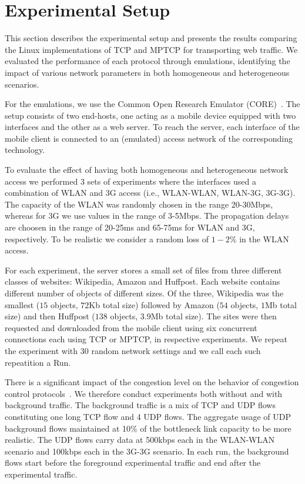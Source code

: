 \section{Experimental Setup }
\label{sec:exp-setup}
This section describes the experimental setup and presents the results comparing
the Linux implementations of TCP and MPTCP for transporting web traffic. We
evaluated the performance of each protocol through emulations, identifying the impact of various network
parameters in both homogeneous and heterogeneous scenarios. 

For the emulations, we use the Common Open Research Emulator (CORE)~\cite{CORE}. The setup consists of
two end-hosts, one acting as a mobile device equipped with two interfaces and the other as a web server. To reach the
server, each interface of the mobile client is connected to an (emulated) access network of the corresponding technology.

To evaluate the effect of having both homogeneous and heterogeneous network access we performed 3 sets
of experiments where the interfaces used a combination of WLAN and 3G access (i.e., WLAN-WLAN, WLAN-3G, 3G-3G).
The capacity of the WLAN was randomly chosen in the range 20-30Mbps, whereas for 3G we use values in the range of 3-5Mbps.
The propagation delays are choosen in the range of 20-25ms and 65-75ms for WLAN and 3G, respectively. To be realistic
we consider a random loss of $1-2\%$ in the WLAN access.

For each experiment, the server stores a small set of files from three different classes
of websites: Wikipedia, Amazon and Huffpost. Each website contains different number of objects of different sizes.
Of the three, Wikipedia was the smallest ($15$ objects, $72$Kb total size) followed by Amazon ($54$ objects, $1$Mb total size)
and then Huffpost ($138$ objects, $3.9$Mb total size). The sites were then requested and downloaded from the mobile
client using six concurrent connections each using TCP or MPTCP, in respective experiments. We repeat the experiment with 30 random
network settings and we call each such repeatition a Run. 


There is a significant impact of the congestion level on the behavior of congestion control protocols~\cite{ha-background-traffic-comnet-2007}.
We therefore conduct experiments both without and with background traffic.  The background traffic is a mix of TCP and UDP flows constituting one
long TCP flow and 4 UDP flows. The aggregate usage of UDP background flows maintained at 10\% of the bottleneck link capacity to be more realistic.
The UDP flows carry data at 500kbps each in the WLAN-WLAN scenario and 100kbps each in the 3G-3G scenario.  In each run, the background flows
start before the foreground experimental traffic and end after the experimental traffic.



